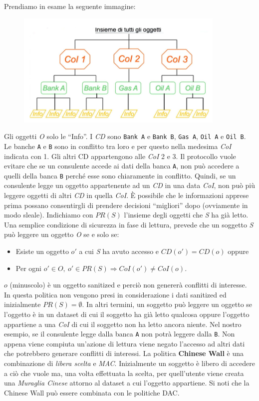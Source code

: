 Prendiamo in esame la seguente immagine:

\begin{figure}[H]
    \centering
    \includegraphics[width=10cm, keepaspectratio]{capitoli/policy/imgs/chinese1.png}
\end{figure}

Gli oggetti \textit{O} solo le “Info”. I \textit{CD} sono \verb|Bank A|
e \verb|Bank B|, \verb|Gas A|, \verb|Oil A| e \verb|Oil B|.
Le banche \verb|A| e \verb|B| sono
in conflitto tra loro e per questo nella
medesima \textit{CoI} indicata con 1. Gli altri CD
appartengono alle \textit{CoI} 2 e 3.
Il protocollo vuole evitare che se un
consulente accede ai dati della banca \verb|A|, non
può accedere a quelli della banca \verb|B| perché
esse sono chiaramente in conflitto.
Quindi, se un consulente legge un oggetto appartenente ad un \textit{CD} in una
data \textit{CoI}, non può più
leggere oggetti di altri \textit{CD} in quella \textit{CoI}.
È possibile che le informazioni apprese prima possano consentirgli di prendere
decisioni “migliori” dopo (ovviamente in modo sleale).
Indichiamo con \(PR(S)\) l'insieme degli oggetti che \textit{S} ha già letto.
Una semplice condizione di sicurezza in fase di lettura, prevede che un soggetto
\textit{S} può leggere un
oggetto \textit{O} se e solo se:

\begin{itemize}
    \item Esiste un oggetto \(o'\) a cui \textit{S} ha avuto accesso e
          \(CD(o') = CD(o)\) oppure
    \item Per ogni \(o' \in O, \ o' \in PR(S) \Rightarrow CoI(o') \neq CoI(o)\).
\end{itemize}

\(o\) (minuscolo) è un oggetto sanitized e perciò non genererà conflitti di
interesse.
In questa politica non vengono presi in considerazione i dati sanitized ed
inizialmente \(PR(S) = \emptyset \).
In altri termini, un soggetto può leggere un oggetto se l'oggetto è in un dataset
di cui il soggetto ha
già letto qualcosa oppure l'oggetto appartiene a una \textit{CoI} di cui il
soggetto non ha letto ancora niente. Nel nostro esempio, se il consulente legge
dalla banca \verb|A| non potrà leggere dalla \verb|B|. Non
appena viene compiuta un'azione di lettura viene negato l'accesso ad altri dati
che potrebbero generare conflitti di interessi.
La politica \textbf{Chinese Wall} è una combinazione di \textit{libera scelta} e
\textit{MAC}. Inizialmente un soggetto è
libero di accedere a ciò che vuole ma, una volta effettuata la scelta, per
quell'utente viene creata una \textit{Muraglia Cinese} attorno al dataset a cui
l'oggetto appartiene.
Si noti che la Chinese Wall può essere combinata con le politiche DAC.

